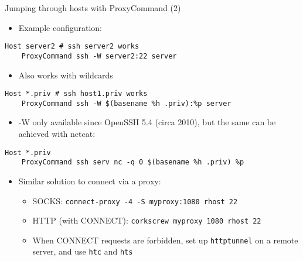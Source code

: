 \documentclass[11pt,final,usepdftitle=false]{beamer}
\begin{document}
\begin{frame}[fragile]{Jumping through hosts with ProxyCommand (2)}
	\hbr
\begin{itemize}
\item Example configuration:
\end{itemize}\vspace{-0.8em}
\begin{lstlisting}[basicstyle=\ttfamily\small,escapeinside={||}]
Host server2 # ssh server2 works
    ProxyCommand ssh -W server2:22 server
\end{lstlisting}\vspace{-0.2em}
\hbr
\begin{itemize}
\item Also works with wildcards
\end{itemize}\vspace{-0.8em}
\begin{lstlisting}[basicstyle=\ttfamily\small,escapeinside={||}]
Host *.priv # ssh host1.priv works
    ProxyCommand ssh -W $(basename %h .priv):%p server
\end{lstlisting}\vspace{-0.2em}
\begin{itemize}
\item -W only available since OpenSSH 5.4 (circa 2010), but the same can be achieved with netcat:
\end{itemize}\vspace{-0.8em}
\begin{lstlisting}[basicstyle=\ttfamily\small,escapeinside={||}]
Host *.priv
    ProxyCommand ssh serv nc -q 0 $(basename %h .priv) %p
\end{lstlisting}\vspace{-0.2em}
\begin{itemize}
\item Similar solution to connect via a proxy:
\begin{itemize}
	\item SOCKS: \texttt{connect-proxy -4 -S myproxy:1080 rhost 22}
	\item HTTP (with CONNECT): \texttt{corkscrew myproxy 1080 rhost 22}
	\item When CONNECT requests are forbidden, set up \texttt{httptunnel} on a remote server, and use \texttt{htc} and \texttt{hts}
\end{itemize}
\end{itemize}
\end{frame}
\end{document}
